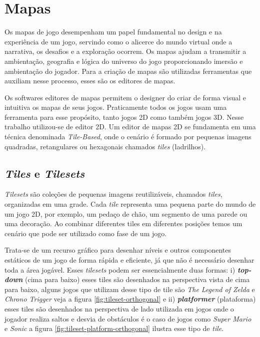 \section{Mapas}
\label{sec-mapas}

Os mapas de jogo desempenham um papel fundamental no design e na experiência de um jogo, servindo como o alicerce do mundo virtual onde a narrativa, os desafios e a exploração ocorrem. Os mapas ajudam a transmitir a ambientação, geografia e lógica do universo do jogo proporcionando imersão e ambientação do jogador. Para a criação de mapas são utilizadas ferramentas que auxiliam nesse processo, esses são os editores de mapas.

 Os softwares editores de mapas permitem o designer do criar de forma visual e intuitiva os mapas de seus jogos. Praticamente todos os jogos usam uma ferramenta para esse propósito, tanto jogos 2D como também jogos 3D. Nesse trabalho  utilizou-se de editor 2D. Um editor de mapas 2D se fundamenta em uma técnica denominada \textit{Tile-Based}, onde o cenário é formado por pequenas imagens quadradas, retangulares ou hexagonais chamados \textit{tiles} (ladrilhos).

\subsection{\textit{Tiles} e \textit{Tilesets}}
\label{sec:tiles-e-tilesets}
\textit{Tilesets} são coleções de pequenas imagens reutilizáveis, chamados \textit{tiles}, organizadas em uma grade. Cada \textit{tile} representa uma pequena parte do mundo de um jogo 2D, por exemplo, um pedaço de chão, um segmento de uma parede ou uma decoração. Ao combinar diferentes tiles em diferentes posições temos um cenário que pode ser utilizado como fase de um jogo. 

Trata-se de um recurso gráfico para desenhar níveis e outros componentes estáticos de um jogo de forma rápida e eficiente, já que não é necessário desenhar toda a área jogável. Esses \textit{tilesets} podem ser essencialmente duas formas: i) \textit{\textbf{top-down}} (cima para baixo) esses tiles são desenhados na perspectiva vista de cima para baixo, alguns jogos que utilizam desse tipo de tile são \textit{The Legend of Zelda} e \textit{Chrono Trigger} veja a figura \ref{fig:tileset-orthogonal} e ii) \textit{\textbf{platformer}} (plataforma) esses tiles são desenhados na perspectiva de lado utilizada em jogos onde o jogador realiza saltos e desvia de obstáculos é o caso de jogos como \textit{Super Mario} e \textit{Sonic} a figura \ref{fig:tileset-platform-orthogonal} ilustra esse tipo de \textit{tile}.

